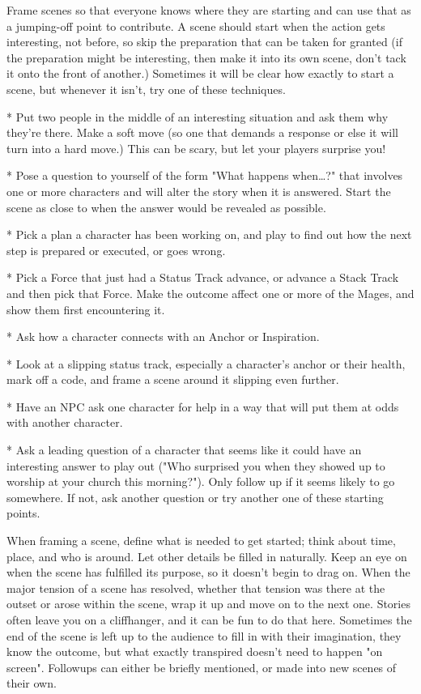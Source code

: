 \documentclass[
  oneside,
  statementpaper,
  9pt]{memoir}
\begin{document}
\begin{MC}

Frame scenes so that everyone knows where they are starting and can use that as a jumping-off point to contribute. A scene should start when the action gets interesting, not before, so skip the preparation that can be taken for granted (if the preparation might be interesting, then make it into its own scene, don’t tack it onto the front of another.) Sometimes it will be clear how exactly to start a scene, but whenever it isn’t, try one of these techniques.

* Put two people in the middle of an interesting situation and ask them why they’re there. Make a soft move (so one that demands a response or else it will turn into a hard move.) This can be scary, but let your players surprise you!

* Pose a question to yourself of the form "What happens when…?" that involves one or more characters and will alter the story when it is answered. Start the scene as close to when the answer would be revealed as possible.

* Pick a plan a character has been working on, and play to find out how the next step is prepared or executed, or goes wrong.

* Pick a Force that just had a Status Track advance, or advance a Stack Track and then pick that Force. Make the outcome affect one or more of the Mages, and show them first encountering it.

* Ask how a character connects with an Anchor or Inspiration.

* Look at a slipping status track, especially a character’s anchor or their health, mark off a code, and frame a scene around it slipping even further.

* Have an NPC ask one character for help in a way that will put them at odds with another character.

* Ask a leading question of a character that seems like it could have an interesting answer to play out ("Who surprised you when they showed up to worship at your church this morning?"). Only follow up if it seems likely to go somewhere. If not, ask another question or try another one of these starting points.

When framing a scene, define what is needed to get started; think about time, place, and who is around. Let other details be filled in naturally. Keep an eye on when the scene has fulfilled its purpose, so it doesn’t begin to drag on. When the major tension of a scene has resolved, whether that tension was there at the outset or arose within the scene, wrap it up and move on to the next one. Stories often leave you on a cliffhanger, and it can be fun to do that here. Sometimes the end of the scene is left up to the audience to fill in with their imagination, they know the outcome, but what exactly transpired doesn't need to happen "on screen". Followups can either be briefly mentioned, or made into new scenes of their own.

\end{MC}
\end{document}
